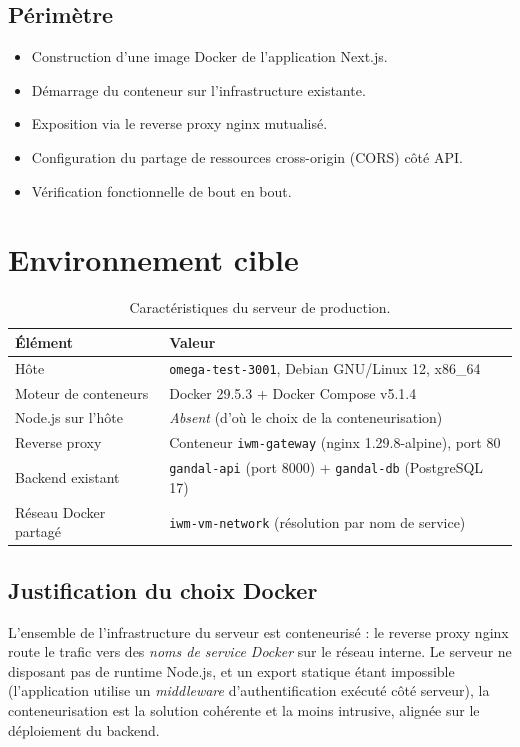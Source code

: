 \documentclass[11pt,a4paper]{article}
\begin{document}
\subsection{Périmètre}
\begin{itemize}[leftmargin=1.4em]
  \item Construction d'une image Docker de l'application Next.js.
  \item Démarrage du conteneur sur l'infrastructure existante.
  \item Exposition via le reverse proxy nginx mutualisé.
  \item Configuration du partage de ressources cross-origin (CORS) côté API.
  \item Vérification fonctionnelle de bout en bout.
\end{itemize}

\section{Environnement cible}

\begin{table}[h]
\centering
\renewcommand{\arraystretch}{1.3}
\begin{tabularx}{\linewidth}{@{}lX@{}}
\toprule
\textbf{Élément} & \textbf{Valeur} \\
\midrule
Hôte & \texttt{omega-test-3001}, Debian GNU/Linux 12, x86\_64 \\
Moteur de conteneurs & Docker 29.5.3 + Docker Compose v5.1.4 \\
Node.js sur l'hôte & \textit{Absent} (d'où le choix de la conteneurisation) \\
Reverse proxy & Conteneur \texttt{iwm-gateway} (nginx 1.29.8-alpine), port 80 \\
Backend existant & \texttt{gandal-api} (port 8000) + \texttt{gandal-db} (PostgreSQL 17) \\
Réseau Docker partagé & \texttt{iwm-vm-network} (résolution par nom de service) \\
\bottomrule
\end{tabularx}
\caption{Caractéristiques du serveur de production.}
\end{table}

\subsection{Justification du choix Docker}
L'ensemble de l'infrastructure du serveur est conteneurisé : le reverse proxy nginx
route le trafic vers des \emph{noms de service Docker} sur le réseau interne. Le serveur
ne disposant pas de runtime Node.js, et un export statique étant impossible (l'application
utilise un \emph{middleware} d'authentification exécuté côté serveur), la conteneurisation
est la solution cohérente et la moins intrusive, alignée sur le déploiement du backend.
\end{document}
